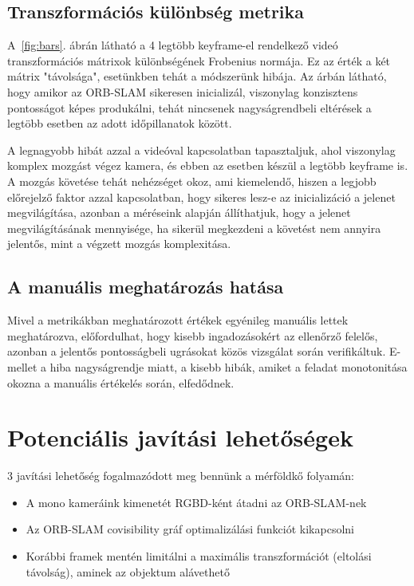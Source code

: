 \subsection{Transzformációs különbség metrika}

A~\ref*{fig:bars}. ábrán látható a 4 legtöbb keyframe-el rendelkező videó transzformációs mátrixok különbségének Frobenius normája.
Ez az érték a két mátrix "távolsága", esetünkben tehát a módszerünk hibája.
Az árbán látható, hogy amikor az ORB-SLAM sikeresen inicializál, viszonylag konzisztens pontosságot képes produkálni, tehát nincsenek nagyságrendbeli eltérések a legtöbb esetben az adott időpillanatok között.

A legnagyobb hibát azzal a videóval kapcsolatban tapasztaljuk, ahol viszonylag komplex mozgást végez kamera, és ebben az esetben készül a legtöbb keyframe is.
A mozgás követése tehát nehézséget okoz, ami kiemelendő, hiszen a legjobb előrejelző faktor azzal kapcsolatban, hogy sikeres lesz-e az inicializáció a jelenet megvilágítása, azonban a méréseink alapján állíthatjuk, hogy a jelenet megvilágításának mennyisége, ha sikerül megkezdeni a követést nem annyira jelentős, mint a végzett mozgás komplexitása.

\subsection{A manuális meghatározás hatása}

Mivel a metrikákban meghatározott értékek egyénileg manuális lettek meghatározva, előfordulhat, hogy kisebb ingadozásokért az ellenőrző felelős, azonban a jelentős pontosságbeli ugrásokat közös vizsgálat során verifikáltuk.
E-mellet a hiba nagyságrendje miatt, a kisebb hibák, amiket a feladat monotonitása okozna a manuális értékelés során, elfedődnek.

\section{Potenciális javítási lehetőségek}

3 javítási lehetőség fogalmazódott meg bennünk a mérföldkő folyamán:
\begin{itemize}
	\item A mono kameráink kimenetét RGBD-ként átadni az ORB-SLAM-nek
	\item Az ORB-SLAM covisibility gráf optimalizálási funkciót kikapcsolni
	\item Korábbi framek mentén limitálni a maximális transzformációt (eltolási távolság), aminek az objektum alávethető
\end{itemize}

